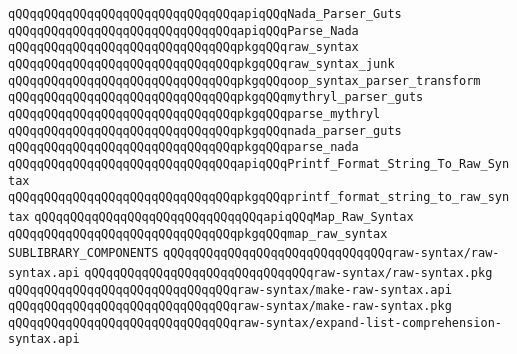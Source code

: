 \newline
\verb|qQQqqQQqqQQqqQQqqQQqqQQqqQQqqQQqapiqQQqNada_Parser_Guts|\newline
\verb|qQQqqQQqqQQqqQQqqQQqqQQqqQQqqQQqapiqQQqParse_Nada|\newline
\newline
\verb|qQQqqQQqqQQqqQQqqQQqqQQqqQQqqQQqpkgqQQqraw_syntax|\newline
\verb|qQQqqQQqqQQqqQQqqQQqqQQqqQQqqQQqpkgqQQqraw_syntax_junk|\newline
\newline
\verb|qQQqqQQqqQQqqQQqqQQqqQQqqQQqqQQqpkgqQQqoop_syntax_parser_transform|\newline
\newline
\newline
\verb|qQQqqQQqqQQqqQQqqQQqqQQqqQQqqQQqpkgqQQqmythryl_parser_guts|\newline
\verb|qQQqqQQqqQQqqQQqqQQqqQQqqQQqqQQqpkgqQQqparse_mythryl|\newline
\newline
\verb|qQQqqQQqqQQqqQQqqQQqqQQqqQQqqQQqpkgqQQqnada_parser_guts|\newline
\verb|qQQqqQQqqQQqqQQqqQQqqQQqqQQqqQQqpkgqQQqparse_nada|\newline
\newline
\verb|qQQqqQQqqQQqqQQqqQQqqQQqqQQqqQQqapiqQQqPrintf_Format_String_To_Raw_Syntax|\newline
\verb|qQQqqQQqqQQqqQQqqQQqqQQqqQQqqQQqpkgqQQqprintf_format_string_to_raw_syntax|\newline
\newline
\verb|qQQqqQQqqQQqqQQqqQQqqQQqqQQqqQQqapiqQQqMap_Raw_Syntax|\newline
\verb|qQQqqQQqqQQqqQQqqQQqqQQqqQQqqQQqpkgqQQqmap_raw_syntax|\newline
\newline
\newline
\newline
\verb|SUBLIBRARY_COMPONENTS|\newline
\newline
\verb|qQQqqQQqqQQqqQQqqQQqqQQqqQQqqQQqraw-syntax/raw-syntax.api|\newline
\verb|qQQqqQQqqQQqqQQqqQQqqQQqqQQqqQQqraw-syntax/raw-syntax.pkg|\newline
\verb|qQQqqQQqqQQqqQQqqQQqqQQqqQQqqQQqraw-syntax/make-raw-syntax.api|\newline
\verb|qQQqqQQqqQQqqQQqqQQqqQQqqQQqqQQqraw-syntax/make-raw-syntax.pkg|\newline
\verb|qQQqqQQqqQQqqQQqqQQqqQQqqQQqqQQqraw-syntax/expand-list-comprehension-syntax.api|\newline
